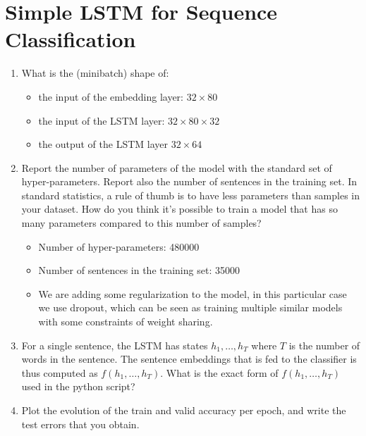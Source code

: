 \documentclass{article} %
\begin{document}
\section{Simple LSTM for Sequence Classification}

\begin{enumerate}
    \item
    What is the (minibatch) shape of:

    \begin{itemize}
        \item
        the input of the embedding layer: $32 \times 80$
        \item
        the input of the LSTM layer: $32 \times 80 \times 32$
        \item
        the output of the LSTM layer $32 \times 64$
    \end{itemize}

    \item
    Report the number of parameters of the model with the standard set of hyper-parameters.
    Report also the number of sentences in the training set. In standard statistics,
    a rule of thumb is to have less parameters than samples in your dataset.
    How do you think it’s possible to train a model that has so many parameters
    compared to this number of samples?

    \begin{itemize}
        \item
        Number of hyper-parameters: 480000
        \item
        Number of sentences in the training set: 35000
        \item
        We are adding some regularization to the model, in this particular case
        we use dropout, which can be seen as training multiple similar models
        with some constraints of weight sharing.
    \end{itemize}

    \item
    For a single sentence, the LSTM has states $h_1, \ldots, h_T$ where $T$ is
    the number of words in the sentence. The sentence embeddings that is fed to
    the classifier is thus computed as $f(h_1, \ldots, h_T)$. What is the exact
    form of $f(h_1, \ldots, h_T)$ used in the python script?


    \item
    Plot the evolution of the train and valid accuracy per epoch, and write the
    test errors that you obtain.


\end{enumerate}
\end{document}
